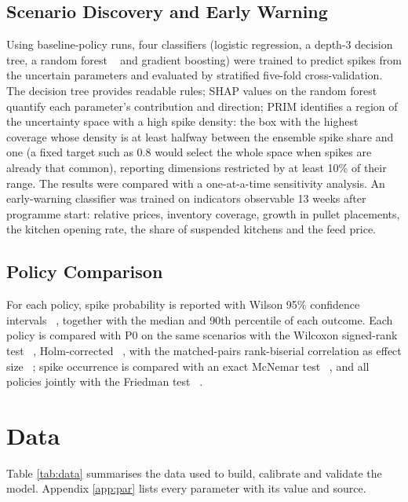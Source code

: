 \documentclass[10pt,twocolumn,a4paper]{article}
\begin{document}
\subsection{Scenario Discovery and Early Warning}

Using baseline-policy runs, four classifiers (logistic regression, a depth-3 decision tree, a random forest ~\cite{breiman2001} and gradient boosting) were trained to predict spikes from the uncertain parameters and evaluated by stratified five-fold cross-validation. The decision tree provides readable rules; SHAP values on the random forest quantify each parameter's contribution and direction; PRIM identifies a region of the uncertainty space with a high spike density: the box with the highest coverage whose density is at least halfway between the ensemble spike share and one (a fixed target such as 0.8 would select the whole space when spikes are already that common), reporting dimensions restricted by at least 10\% of their range. The results were compared with a one-at-a-time sensitivity analysis. An early-warning classifier was trained on indicators observable 13 weeks after programme start: relative prices, inventory coverage, growth in pullet placements, the kitchen opening rate, the share of suspended kitchens and the feed price.


\subsection{Policy Comparison}

For each policy, spike probability is reported with Wilson 95\% confidence intervals ~\cite{wilson1927}, together with the median and 90th percentile of each outcome. Each policy is compared with P0 on the same scenarios with the Wilcoxon signed-rank test ~\cite{wilcoxon1945}, Holm-corrected ~\cite{holm1979}, with the matched-pairs rank-biserial correlation as effect size ~\cite{kerby2014}; spike occurrence is compared with an exact McNemar test ~\cite{mcnemar1947}, and all policies jointly with the Friedman test ~\cite{friedman1937}.


\section{Data}\label{sec:data}

Table \ref{tab:data} summarises the data used to build, calibrate and validate the model. Appendix \ref{app:par} lists every parameter with its value and source.
\end{document}
